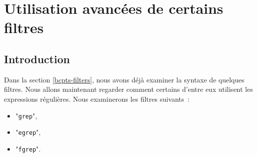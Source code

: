 %
%

\setcounter{remarque-cnt}{1}
\setcounter{example-cnt}{1}
\chapter{\label{adv-filters}Utilisation avanc{\'e}es de certains filtres}

\section{Introduction}

Dans la section \ref{bcpts-filters}, nous avons d{\'e}j{\`a} examiner la
syntaxe de quelques filtres. Nous allons maintenant regarder comment
certains d'entre eux utilisent les expressions r{\'e}guli{\`e}res. Nous
examinerons les filtres suivants~:
\begin{itemize}
	\item	"{\tt grep}",
	\item	"{\tt egrep}",
	\item	"{\tt fgrep}".
\end{itemize}

